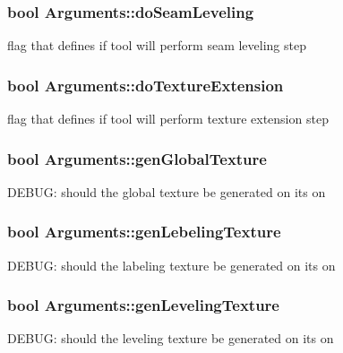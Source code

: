 \subsubsection[{do\+Seam\+Leveling}]{\setlength{\rightskip}{0pt plus 5cm}bool Arguments\+::do\+Seam\+Leveling}\label{struct_arguments_a37157aeefb4bab06270e0787c0bac2cb}
flag that defines if tool will perform seam leveling step \hypertarget{struct_arguments_aa8074aacbc6ee3f99effd5b7613905e5}{}
\subsubsection[{do\+Texture\+Extension}]{\setlength{\rightskip}{0pt plus 5cm}bool Arguments\+::do\+Texture\+Extension}\label{struct_arguments_aa8074aacbc6ee3f99effd5b7613905e5}
flag that defines if tool will perform texture extension step \hypertarget{struct_arguments_ac401fe9a04307aa31bda75d4424ceed3}{}
\subsubsection[{gen\+Global\+Texture}]{\setlength{\rightskip}{0pt plus 5cm}bool Arguments\+::gen\+Global\+Texture}\label{struct_arguments_ac401fe9a04307aa31bda75d4424ceed3}
D\+E\+B\+U\+G\+: should the \textquotesingle{}global\textquotesingle{} texture be generated on its on \hypertarget{struct_arguments_a50abe906778cd4d167400327224437aa}{}
\subsubsection[{gen\+Lebeling\+Texture}]{\setlength{\rightskip}{0pt plus 5cm}bool Arguments\+::gen\+Lebeling\+Texture}\label{struct_arguments_a50abe906778cd4d167400327224437aa}
D\+E\+B\+U\+G\+: should the \textquotesingle{}labeling\textquotesingle{} texture be generated on its on \hypertarget{struct_arguments_a3cb31e33468d5ac33e53a155da84b3d2}{}
\subsubsection[{gen\+Leveling\+Texture}]{\setlength{\rightskip}{0pt plus 5cm}bool Arguments\+::gen\+Leveling\+Texture}\label{struct_arguments_a3cb31e33468d5ac33e53a155da84b3d2}
D\+E\+B\+U\+G\+: should the \textquotesingle{}leveling\textquotesingle{} texture be generated on its on \hypertarget{struct_arguments_acada25027fb72d5a7d8440b62653af2f}{}

